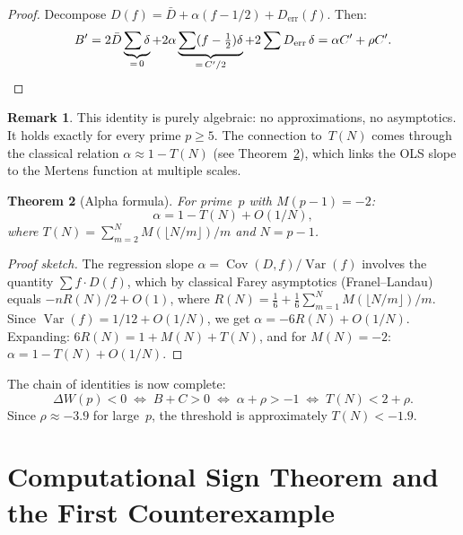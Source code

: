 \documentclass[11pt]{article}
\newtheorem{theorem}{Theorem}[section]
\theoremstyle{definition}
\newtheorem{remark}[theorem]{Remark}
\DeclareMathOperator{\Cov}{Cov}
\DeclareMathOperator{\Var}{Var}
\begin{document}
\begin{proof}
Decompose $D(f) = \bar{D} + \alpha(f - 1/2) + D_{\mathrm{err}}(f)$.  Then:
\[
  B' = 2\bar{D}\underbrace{\sum\delta}_{=\,0}
  + 2\alpha\underbrace{\sum(f - \tfrac{1}{2})\delta}_{=\,C'/2}
  + 2\sum D_{\mathrm{err}}\,\delta
  = \alpha C' + \rho C'.  \qedhere
\]
\end{proof}

\begin{remark}
This identity is purely algebraic: no approximations, no asymptotics.
It holds exactly for every prime $p \ge 5$.  The connection to~$T(N)$
comes through the classical relation $\alpha \approx 1 - T(N)$ (see
Theorem~\ref{thm:alpha-formula}), which links the OLS slope to the
Mertens function at multiple scales.
\end{remark}

\begin{theorem}[Alpha formula]\label{thm:alpha-formula}
For prime~$p$ with $M(p-1) = -2$:
\[
  \alpha = 1 - T(N) + O(1/N),
\]
where $T(N) = \sum_{m=2}^{N} M(\lfloor N/m \rfloor)/m$ and $N = p-1$.
\end{theorem}

\begin{proof}[Proof sketch]
The regression slope $\alpha = \Cov(D,f)/\Var(f)$ involves the quantity
$\sum f \cdot D(f)$, which by classical Farey asymptotics (Franel--Landau)
equals $-nR(N)/2 + O(1)$, where
$R(N) = \frac{1}{6} + \frac{1}{6}\sum_{m=1}^{N} M(\lfloor N/m\rfloor)/m$.
Since $\Var(f) = 1/12 + O(1/N)$, we get $\alpha = -6R(N) + O(1/N)$.
Expanding: $6R(N) = 1 + M(N) + T(N)$, and for $M(N) = -2$:
$\alpha = 1 - T(N) + O(1/N)$.
\end{proof}

The chain of identities is now complete:
\[
  \Delta W(p) < 0
  \;\Longleftrightarrow\; B + C > 0
  \;\Longleftrightarrow\; \alpha + \rho > -1
  \;\Longleftrightarrow\; T(N) < 2 + \rho.
\]
Since $\rho \approx -3.9$ for large~$p$, the threshold is approximately
$T(N) < -1.9$.



\section{Computational Sign Theorem and the First Counterexample}
\label{sec:sign}
\end{document}
